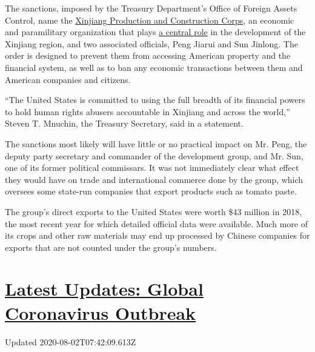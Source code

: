 The sanctions, imposed by the Treasury Department's Office of Foreign
Assets Control, name the
\href{https://www.nytimes3xbfgragh.onion/2009/08/07/world/asia/07xinjiang.html}{Xinjiang
Production and Construction Corps}, an economic and paramilitary
organization that plays
\href{https://www.andrewerickson.com/2019/11/the-xinjiang-production-construction-corps-key-policy-tool-from-mao-to-xi/}{a
central role} in the development of the Xinjiang region, and two
associated officials, Peng Jiarui and Sun Jinlong. The order is designed
to prevent them from accessing American property and the financial
system, as well as to ban any economic transactions between them and
American companies and citizens.

``The United States is committed to using the full breadth of its
financial powers to hold human rights abusers accountable in Xinjiang
and across the world,'' Steven T. Mnuchin, the Treasury Secretary, said
in a statement.

The sanctions most likely will have little or no practical impact on Mr.
Peng, the deputy party secretary and commander of the development group,
and Mr. Sun, one of its former political commissars. It was not
immediately clear what effect they would have on trade and international
commerce done by the group, which oversees some state-run companies that
export products such as tomato paste.

The group's direct exports to the United States were worth \$43 million
in 2018, the most recent year for which detailed official data were
available. Much more of its crops and other raw materials may end up
processed by Chinese companies for exports that are not counted under
the group's numbers.

\hypertarget{latest-updates-global-coronavirus-outbreak}{%
\section{\texorpdfstring{\href{https://www.nytimes3xbfgragh.onion/2020/08/01/world/coronavirus-covid-19.html?action=click\&pgtype=Article\&state=default\&region=MAIN_CONTENT_1\&context=storylines_live_updates}{Latest
Updates: Global Coronavirus
Outbreak}}{Latest Updates: Global Coronavirus Outbreak}}\label{latest-updates-global-coronavirus-outbreak}}

Updated 2020-08-02T07:42:09.613Z

